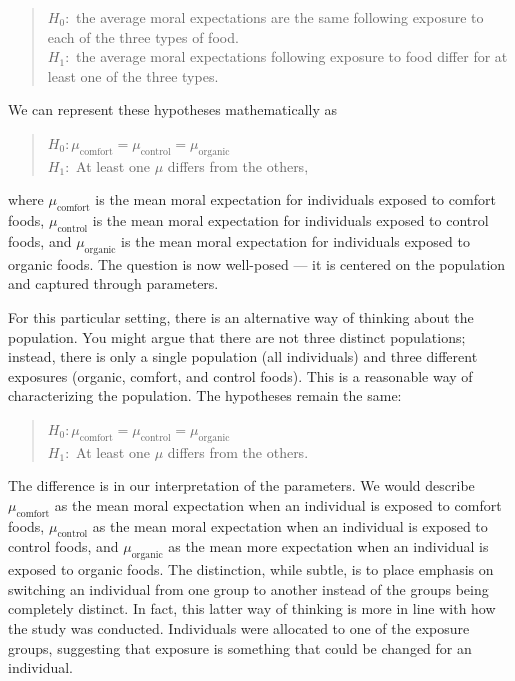 \documentclass[
  letterpaper,
  DIV=11,
  numbers=noendperiod]{scrreprt}
\theoremstyle{plain}
\theoremstyle{definition}
\theoremstyle{definition}
\theoremstyle{remark}
\begin{document}
\begin{quote}
\(H_0:\) the average moral expectations are the same following exposure
to each of the three types of food.\\
\(H_1:\) the average moral expectations following exposure to food
differ for at least one of the three types.
\end{quote}

We can represent these hypotheses mathematically as

\begin{quote}
\(H_0: \mu_{\text{comfort}} = \mu_{\text{control}} = \mu_{\text{organic}}\)\\
\(H_1:\) At least one \(\mu\) differs from the others,
\end{quote}

where \(\mu_{\text{comfort}}\) is the mean moral expectation for
individuals exposed to comfort foods, \(\mu_{\text{control}}\) is the
mean moral expectation for individuals exposed to control foods, and
\(\mu_{\text{organic}}\) is the mean moral expectation for individuals
exposed to organic foods. The question is now well-posed --- it is
centered on the population and captured through parameters.

For this particular setting, there is an alternative way of thinking
about the population. You might argue that there are not three distinct
populations; instead, there is only a single population (all
individuals) and three different exposures (organic, comfort, and
control foods). This is a reasonable way of characterizing the
population. The hypotheses remain the same:

\begin{quote}
\(H_0: \mu_{\text{comfort}} = \mu_{\text{control}} = \mu_{\text{organic}}\)\\
\(H_1:\) At least one \(\mu\) differs from the others.
\end{quote}

The difference is in our interpretation of the parameters. We would
describe \(\mu_{\text{comfort}}\) as the mean moral expectation when an
individual is exposed to comfort foods, \(\mu_{\text{control}}\) as the
mean moral expectation when an individual is exposed to control foods,
and \(\mu_{\text{organic}}\) as the mean more expectation when an
individual is exposed to organic foods. The distinction, while subtle,
is to place emphasis on switching an individual from one group to
another instead of the groups being completely distinct. In fact, this
latter way of thinking is more in line with how the study was conducted.
Individuals were allocated to one of the exposure groups, suggesting
that exposure is something that could be changed for an individual.
\end{document}

